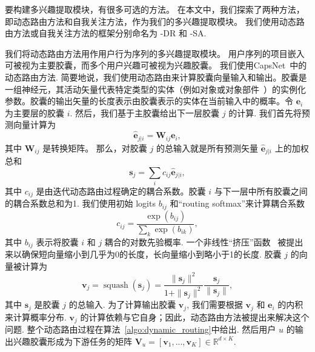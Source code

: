 
要构建多兴趣提取模块，有很多可选的方法。 在本文中，我们探索了两种方法，即动态路由方法和自我关注方法，作为我们的多兴趣提取模块。 我们使用动态路由方法或自我关注方法的框架分别命名为 \model-DR 和 \model-SA.

我们将动态路由方法用作用户行为序列的多兴趣提取模块。 用户序列的项目嵌入可被视为主要胶囊，而多个用户兴趣可被视为兴趣胶囊。 我们使用CapsNet~\cite{sabour2017dynamic}中的动态路由方法. 
简要地说，我们使用动态路由来计算胶囊向量输入和输出。胶囊是一组神经元，其活动矢量代表特定类型的实体（例如对象或对象部件~\cite{sabour2017dynamic}）的实例化参数。胶囊的输出矢量的长度表示由胶囊表示的实体在当前输入中的概率。令 $\mathbf{e}_i$ 为主要层的胶囊 $i$. 然后，我们基于主胶囊给出下一层胶囊 $j$ 的计算. 
我们首先将预测向量计算为
\begin{equation}
    \hat{\mathbf{e}}_{j|i}=\mathbf{W}_{ij} \mathbf{e}_{i},
\end{equation}
其中 $\mathbf{W}_{ij}$ 是转换矩阵。 那么，对胶囊 $j$ 的总输入就是所有预测矢量 $\hat{\mathbf{e}}_{j|i}$ 上的加权总和
\begin{equation}
        \mathbf{s}_j = \sum_i c_{ij} \hat{\mathbf{e}}_{j|i},
\end{equation}
其中 $c_{ij}$ 是由迭代动态路由过程确定的耦合系数。胶囊 $i$ 与下一层中所有胶囊之间的耦合系数总和为1. 我们使用初始 logits $b_{ij}$ 和“routing softmax”来计算耦合系数
\begin{equation}
    c_{ij}=\frac{\exp(b_{ij})}{\sum_k \exp(b_{ik})},
\end{equation}
其中 $b_{ij}$ 表示将胶囊 $i$ 和 $j$ 耦合的对数先验概率. 一个非线性“挤压”函数~\cite{sabour2017dynamic} 被提出来以确保短向量缩小到几乎为0的长度，长向量缩小到略小于1的长度. 胶囊 $j$ 的向量被计算为
\begin{equation}
    \label{eqn:squash}
    \mathbf{v}_j = \operatorname{squash}(\mathbf{s}_j) =  \frac{\|\mathbf{s}_j\|^2}{1+\|\mathbf{s}_j\|^2} \frac{\mathbf{s}_j}{\|\mathbf{s}_j\|},
\end{equation}
其中 $\mathbf{s}_j$ 是胶囊 $j$ 的总输入. 为了计算输出胶囊 $\mathbf{v}_j$, 我们需要根据 $\mathbf{v}_j$ 和 $\mathbf{e}_i$ 的内积来计算概率分布. $\mathbf{v}_j$ 的计算依赖与它自身；因此，动态路由方法被提出来解决这个问题. 整个动态路由过程在算法~\ref{algo:dynamic_routing}中给出. 然后用户 $u$ 的输出兴趣胶囊形成为下游任务的矩阵 $\mathbf{V}_u=[\mathbf{v}_1, ..., \mathbf{v}_K] \in \mathbb{R}^{d\times K}$.

